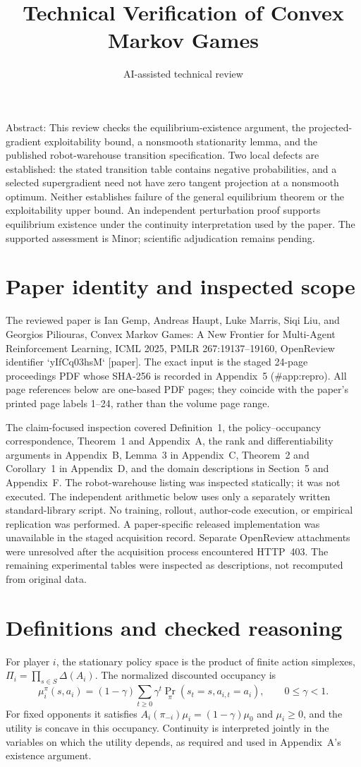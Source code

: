 \documentclass[10pt]{article}
\title{Technical Verification of
Convex Markov Games}
\author{AI-assisted technical review}
\date{}
\begin{document}
\maketitle
Abstract: This review checks the equilibrium-existence argument, the projected-gradient exploitability bound, a nonsmooth stationarity lemma, and the published robot-warehouse transition specification. Two local defects are established: the stated transition table contains negative probabilities, and a selected supergradient need not have zero tangent projection at a nonsmooth optimum. Neither establishes failure of the general equilibrium theorem or the exploitability upper bound. An independent perturbation proof supports equilibrium existence under the continuity interpretation used by the paper. The supported assessment is Minor; scientific adjudication remains pending.\par
\section*{Paper identity and inspected scope}
The reviewed paper is Ian Gemp, Andreas Haupt, Luke Marris, Siqi Liu, and Georgios Piliouras, Convex Markov Games: A New Frontier for Multi-Agent Reinforcement Learning, ICML 2025, PMLR 267:19137–19160, OpenReview identifier `yIfCq03hsM` [paper]. The exact input is the staged 24-page proceedings PDF whose SHA-256 is recorded in Appendix 5 (\#app:repro). All page references below are one-based PDF pages; they coincide with the paper’s printed page labels 1–24, rather than the volume page range.\par
The claim-focused inspection covered Definition 1, the policy–occupancy correspondence, Theorem 1 and Appendix A, the rank and differentiability arguments in Appendix B, Lemma 3 in Appendix C, Theorem 2 and Corollary 1 in Appendix D, and the domain descriptions in Section 5 and Appendix F. The robot-warehouse listing was inspected statically; it was not executed. The independent arithmetic below uses only a separately written standard-library script. No training, rollout, author-code execution, or empirical replication was performed. A paper-specific released implementation was unavailable in the staged acquisition record. Separate OpenReview attachments were unresolved after the acquisition process encountered HTTP 403. The remaining experimental tables were inspected as descriptions, not recomputed from original data.\par
\section*{Definitions and checked reasoning}
For player \(i\), the stationary policy space is the product of finite action simplexes, \(\Pi_i=\prod_{s\in S}\Delta(A_i)\). The normalized discounted occupancy is \[\mu_i^\pi(s,a_i)=(1-\gamma)\sum_{t\geq0}\gamma^t
 \Pr_\pi(s_t=s,a_{i,t}=a_i),\qquad 0\leq\gamma<1.\] For fixed opponents it satisfies \(A_i(\pi_{-i})\mu_i=(1-\gamma)\mu_0\) and \(\mu_i\geq0\), and the utility is concave in this occupancy. Continuity is interpreted jointly in the variables on which the utility depends, as required and used in Appendix A’s existence argument.\par
\end{document}
